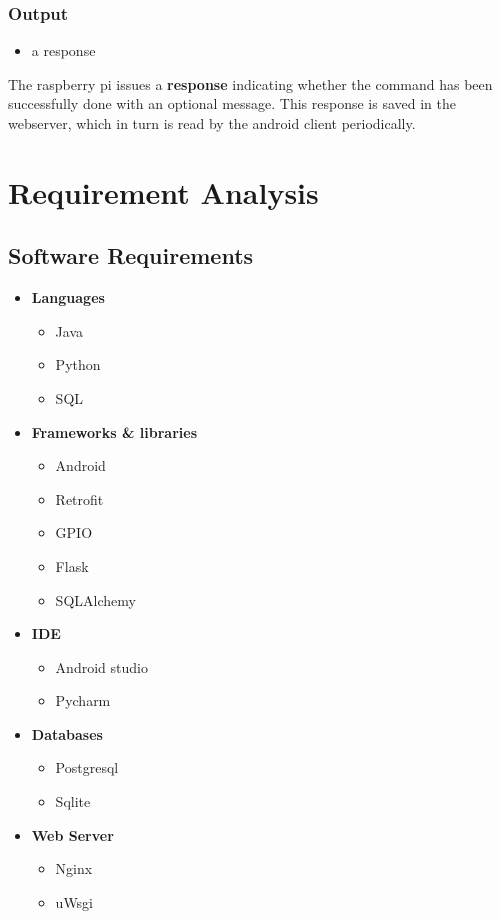 \documentclass[12pt, oneside, a4paper]{book}
\newcommand\boldcolor[1]{\textcolor{bold}{\textbf{#1}}}
\begin{document}
				\subsubsection{Output}
				\begin{itemize}
					\item a response
				\end{itemize}
				The raspberry pi issues a \textbf{response} indicating whether the command has been successfully done with an optional message. This response is saved in the webserver, which in turn is read by the android client periodically.  
			
		\newpage\section{Requirement Analysis}
			\subsection{Software Requirements}
			\begin{itemize}
				\item \boldcolor{Languages}
				\begin{itemize}
					\item Java
					\item Python
					\item SQL
				\end{itemize}
				
				\item \boldcolor{Frameworks \& libraries}
				\begin{itemize}
					\item Android
					\item Retrofit
					\item GPIO
					\item Flask
					\item SQLAlchemy
				\end{itemize}

				\item \boldcolor{IDE}
				\begin{itemize}
					\item Android studio
					\item Pycharm
				\end{itemize}

				\item \boldcolor{Databases}
				\begin{itemize}
					\item Postgresql
					\item Sqlite
				\end{itemize}
			
				\item \boldcolor{Web Server}
				\begin{itemize}
					\item Nginx
					\item uWsgi
				\end{itemize}
			\end{itemize}
\end{document}
